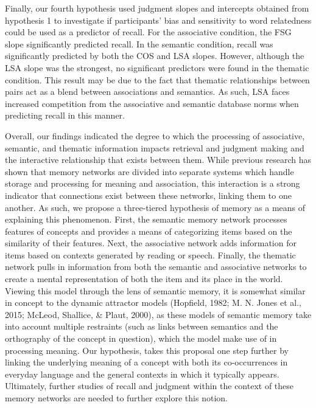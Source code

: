 \documentclass[english,man]{apa6}
\theoremstyle{definition}
\theoremstyle{definition}
\theoremstyle{definition}
\theoremstyle{remark}
\begin{document}
Finally, our fourth hypothesis used judgment slopes and intercepts
obtained from hypothesis 1 to investigate if participants' bias and
sensitivity to word relatedness could be used as a predictor of recall.
For the associative condition, the FSG slope significantly predicted
recall. In the semantic condition, recall was significantly predicted by
both the COS and LSA slopes. However, although the LSA slope was the
strongest, no significant predictors were found in the thematic
condition. This result may be due to the fact that thematic
relationships between pairs act as a blend between associations and
semantics. As such, LSA faces increased competition from the associative
and semantic database norms when predicting recall in this manner.

Overall, our findings indicated the degree to which the processing of
associative, semantic, and thematic information impacts retrieval and
judgment making and the interactive relationship that exists between
them. While previous research has shown that memory networks are divided
into separate systems which handle storage and processing for meaning
and association, this interaction is a strong indicator that connections
exist between these networks, linking them to one another. As such, we
propose a three-tiered hypothesis of memory as a means of explaining
this phenomenon. First, the semantic memory network processes features
of concepts and provides a means of categorizing items based on the
similarity of their features. Next, the associative network adds
information for items based on contexts generated by reading or speech.
Finally, the thematic network pulls in information from both the
semantic and associative networks to create a mental representation of
both the item and its place in the world. Viewing this model through the
lens of semantic memory, it is somewhat similar in concept to the
dynamic attractor models (Hopfield, 1982; M. N. Jones et al., 2015;
McLeod, Shallice, \& Plaut, 2000), as these models of semantic memory
take into account multiple restraints (such as links between semantics
and the orthography of the concept in question), which the model make
use of in processing meaning. Our hypothesis, takes this proposal one
step further by linking the underlying meaning of a concept with both
its co-occurrences in everyday language and the general contexts in
which it typically appears. Ultimately, further studies of recall and
judgment within the context of these memory networks are needed to
further explore this notion.
\end{document}
